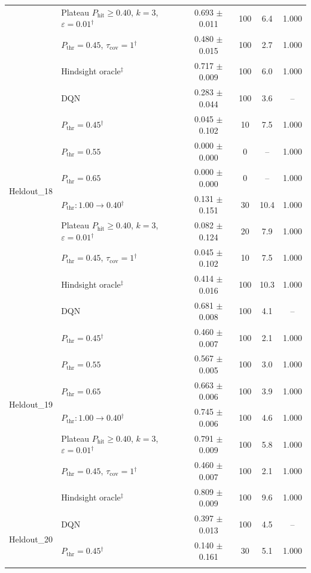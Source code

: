 \begin{table}[htbp]
\begin{tabular}{llcccc}
 & Plateau $P_{\mathrm{hit}}\geq0.40$, $k=3$, $\varepsilon=0.01$$^{\dagger}$ & 0.693 $\pm$ 0.011 & 100 & 6.4 & 1.000 \\
 & $P_{\mathrm{thr}}=0.45$, $\tau_{\mathrm{cov}}=1$$^{\dagger}$ & 0.480 $\pm$ 0.015 & 100 & 2.7 & 1.000 \\
 & Hindsight oracle$^{\ddagger}$ & 0.717 $\pm$ 0.009 & 100 & 6.0 & 1.000 \\
\midrule
\multirow{8}{*}{Heldout\_18} & DQN & 0.283 $\pm$ 0.044 & 100 & 3.6 & -- \\
 & $P_{\mathrm{thr}}=0.45$$^{\dagger}$ & 0.045 $\pm$ 0.102 & 10 & 7.5 & 1.000 \\
 & $P_{\mathrm{thr}}=0.55$ & 0.000 $\pm$ 0.000 & 0 & -- & 1.000 \\
 & $P_{\mathrm{thr}}=0.65$ & 0.000 $\pm$ 0.000 & 0 & -- & 1.000 \\
 & $P_{\mathrm{thr}}: 1.00 \to 0.40$$^{\dagger}$ & 0.131 $\pm$ 0.151 & 30 & 10.4 & 1.000 \\
 & Plateau $P_{\mathrm{hit}}\geq0.40$, $k=3$, $\varepsilon=0.01$$^{\dagger}$ & 0.082 $\pm$ 0.124 & 20 & 7.9 & 1.000 \\
 & $P_{\mathrm{thr}}=0.45$, $\tau_{\mathrm{cov}}=1$$^{\dagger}$ & 0.045 $\pm$ 0.102 & 10 & 7.5 & 1.000 \\
 & Hindsight oracle$^{\ddagger}$ & 0.414 $\pm$ 0.016 & 100 & 10.3 & 1.000 \\
\midrule
\multirow{8}{*}{Heldout\_19} & DQN & 0.681 $\pm$ 0.008 & 100 & 4.1 & -- \\
 & $P_{\mathrm{thr}}=0.45$$^{\dagger}$ & 0.460 $\pm$ 0.007 & 100 & 2.1 & 1.000 \\
 & $P_{\mathrm{thr}}=0.55$ & 0.567 $\pm$ 0.005 & 100 & 3.0 & 1.000 \\
 & $P_{\mathrm{thr}}=0.65$ & 0.663 $\pm$ 0.006 & 100 & 3.9 & 1.000 \\
 & $P_{\mathrm{thr}}: 1.00 \to 0.40$$^{\dagger}$ & 0.745 $\pm$ 0.006 & 100 & 4.6 & 1.000 \\
 & Plateau $P_{\mathrm{hit}}\geq0.40$, $k=3$, $\varepsilon=0.01$$^{\dagger}$ & 0.791 $\pm$ 0.009 & 100 & 5.8 & 1.000 \\
 & $P_{\mathrm{thr}}=0.45$, $\tau_{\mathrm{cov}}=1$$^{\dagger}$ & 0.460 $\pm$ 0.007 & 100 & 2.1 & 1.000 \\
 & Hindsight oracle$^{\ddagger}$ & 0.809 $\pm$ 0.009 & 100 & 9.6 & 1.000 \\
\midrule
\multirow{8}{*}{Heldout\_20} & DQN & 0.397 $\pm$ 0.013 & 100 & 4.5 & -- \\
 & $P_{\mathrm{thr}}=0.45$$^{\dagger}$ & 0.140 $\pm$ 0.161 & 30 & 5.1 & 1.000 \\
$$
\end{tabular}
\end{table}
